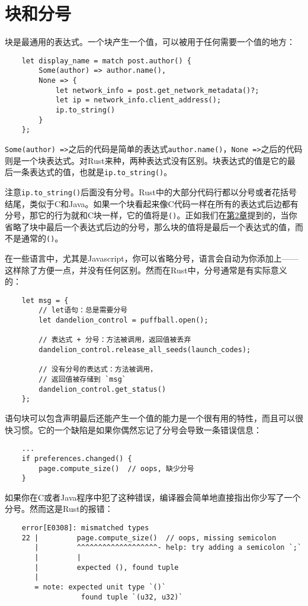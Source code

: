 \section{块和分号}

块是最通用的表达式。一个块产生一个值，可以被用于任何需要一个值的地方：\begin{verbatim}
    let display_name = match post.author() {
        Some(author) => author.name(),
        None => {
            let network_info = post.get_network_metadata()?;
            let ip = network_info.client_address();
            ip.to_string()
        }
    };
\end{verbatim}
\texttt{Some(author) =>}之后的代码是简单的表达式\texttt{author.name()}，\texttt{None =>}之后的代码则是一个块表达式。对Rust来种，两种表达式没有区别。块表达式的值是它的最后一条表达式的值，也就是\texttt{ip.to\_string()}。

注意\texttt{ip.to\_string()}后面没有分号。Rust中的大部分代码行都以分号或者花括号结尾，类似于C和Java。如果一个块看起来像C代码一样在所有的表达式后边都有分号，那它的行为就和C块一样，它的值将是\texttt{()}。正如我们在\hyperref[ch02]{第2章}提到的，当你省略了块中最后一个表达式后边的分号，那么块的值将是最后一个表达式的值，而不是通常的\texttt{()}。

在一些语言中，尤其是Javascript，你可以省略分号，语言会自动为你添加上——这样除了方便一点，并没有任何区别。然而在Rust中，分号通常是有实际意义的：
\begin{verbatim}
    let msg = {
        // let语句：总是需要分号
        let dandelion_control = puffball.open();

        // 表达式 + 分号：方法被调用，返回值被丢弃
        dandelion_control.release_all_seeds(launch_codes);

        // 没有分号的表达式：方法被调用，
        // 返回值被存储到 `msg`
        dandelion_control.get_status()
    };
\end{verbatim}

语句块可以包含声明最后还能产生一个值的能力是一个很有用的特性，而且可以很快习惯。它的一个缺陷是如果你偶然忘记了分号会导致一条错误信息：
\begin{verbatim}
    ...
    if preferences.changed() {
        page.compute_size()  // oops, 缺少分号
    }
\end{verbatim}

如果你在C或者Java程序中犯了这种错误，编译器会简单地直接指出你少写了一个分号。然而这是Rust的报错：
\begin{verbatim}
    error[E0308]: mismatched types
    22 |         page.compute_size()  // oops, missing semicolon
       |         ^^^^^^^^^^^^^^^^^^^- help: try adding a semicolon `;`
       |         |
       |         expected (), found tuple
       |
       = note: expected unit type `()`
                  found tuple `(u32, u32)`
\end{verbatim}

